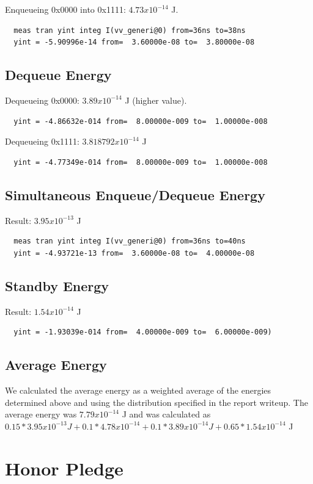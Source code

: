 \documentclass[12pt]{report}
\begin{document}
  Enqueueing 0x0000 into 0x1111: $4.73 x 10^{-14}$ J.
  \begin{verbatim}
  meas tran yint integ I(vv_generi@0) from=36ns to=38ns
  yint = -5.90996e-14 from=  3.60000e-08 to=  3.80000e-08
  \end{verbatim}
\subsection*{Dequeue Energy}
  Dequeueing 0x0000: $3.89 x 10^{-14}$ J (higher value).
  \begin{verbatim}
  yint = -4.86632e-014 from=  8.00000e-009 to=  1.00000e-008
  \end{verbatim}
  Dequeueing 0x1111: $3.818792 x 10^{-14}$ J 
  \begin{verbatim}
  yint = -4.77349e-014 from=  8.00000e-009 to=  1.00000e-008
  \end{verbatim}
\subsection*{Simultaneous Enqueue/Dequeue Energy}
  Result: $3.95 x 10^{-13}$ J
  \begin{verbatim}
  meas tran yint integ I(vv_generi@0) from=36ns to=40ns
  yint = -4.93721e-13 from=  3.60000e-08 to=  4.00000e-08
  \end{verbatim}
\subsection*{Standby Energy}
  Result:    $1.54 x 10^{-14}$ J 
  \begin{verbatim}
  yint = -1.93039e-014 from=  4.00000e-009 to=  6.00000e-009)
  \end{verbatim}
\subsection*{Average Energy}
  We calculated the average energy as a weighted average of the energies determined above and using the distribution specified in the report writeup. The average energy was $7.79 x 10^{-14}$ J and was calculated as $0.15 * 3.95 x 10^{-13} J + 0.1 * 4.78 x 10^{-14} + 0.1 * 3.89 x 10^{-14} J + 0.65 * 1.54 x 10^{-14}$ J

\newpage
\section*{Honor Pledge}
\begin{center}
\end{center}
\end{document}
